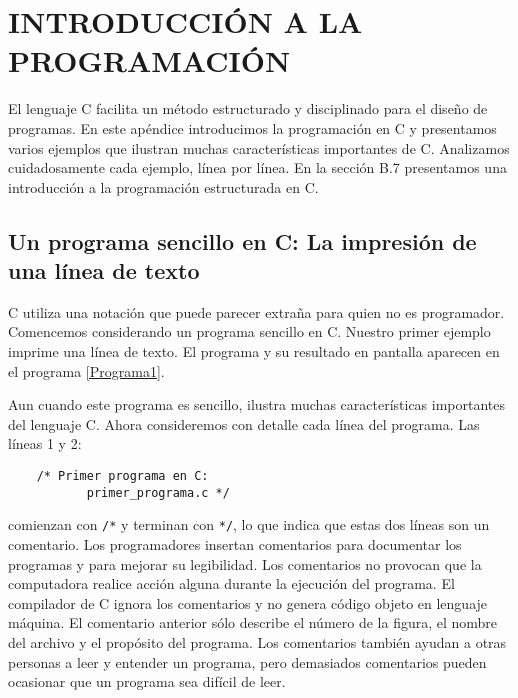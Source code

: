 \chapter[INTRODUCCIÓN A LA PROGRAMACIÓN]{INTRODUCCIÓN A LA \\ PROGRAMACIÓN}
\printchaptertableofcontents

El lenguaje C facilita un método estructurado y disciplinado para el diseño de programas. En este apéndice introducimos la programación en C y presentamos varios ejemplos que ilustran muchas características importantes de C. Analizamos cuidadosamente cada ejemplo, línea por línea. En la sección B.7 presentamos una introducción a la programación estructurada en C. 

\section{Un programa sencillo en C: La impresión de una línea de texto}

C utiliza una notación que puede parecer extraña para quien no es programador. Comencemos considerando un programa sencillo en C. Nuestro primer ejemplo imprime una línea de texto. El programa y su resultado en pantalla aparecen en el programa \ref{Programa1}.

Aun cuando este programa es sencillo, ilustra muchas características importantes del lenguaje C. Ahora consideremos con detalle cada línea del programa. Las líneas 1 y 2:
\begin{verbatim}
    /* Primer programa en C:
           primer_programa.c */
\end{verbatim}
comienzan con \texttt{/*} y terminan con \texttt{*/}, lo que indica que estas dos líneas son un comentario. Los programadores insertan comentarios para documentar los programas y para mejorar su legibilidad. Los comentarios no provocan que la computadora realice acción alguna durante la ejecución del programa. El compilador de C ignora los comentarios y no genera código objeto en lenguaje máquina. El comentario anterior sólo describe el número de la figura, el nombre del archivo y el propósito del programa. Los comentarios también ayudan a otras personas a leer y entender un programa, pero demasiados comentarios pueden ocasionar que un programa sea difícil de leer.

